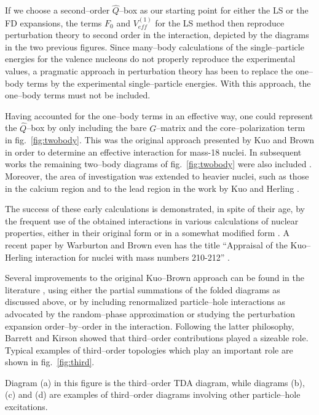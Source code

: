 If we choose a second--order $\hat{Q}$--box as our starting point for either the 
LS or the FD expansions, the terms 
$F_0$ and $V_{eff}^{(1)}$ for the LS method then reproduce perturbation theory to second order
in the interaction, depicted by the diagrams in the two previous figures. Since many--body
calculations of the single--particle energies for the valence nucleons do not
properly reproduce the experimental values, a pragmatic approach in perturbation theory has 
been to replace the one--body terms by the experimental single--particle energies. With this
approach, the one--body terms must not be included.

Having accounted for the one--body terms in an effective way, one could represent the
$\hat{Q}$--box by only including the bare $G$--matrix and the core--polarization term
in fig.\ \ref{fig:twobody}. This was the original approach presented by Kuo and Brown
\cite{kb66} in order to determine an effective interaction for mass-18 nuclei.
In subsequent works the remaining two--body diagrams of fig.\ \ref{fig:twobody} were
also included \cite{kuo68}. Moreover, the area of investigation was extended to heavier nuclei,
such as those in the calcium region \cite{kb68} and to the lead region in the work
by Kuo and Herling \cite{hk72}.

The success of these early calculations is demonstrated, in spite of their age,  by the frequent
use of the obtained interactions in various calculations of nuclear properties, either
in their original form or in a somewhat modified form \cite{brown88,ryd90}. A recent
paper by Warburton and Brown even has the title ``Appraisal of the Kuo--Herling interaction
for nuclei with mass numbers 210-212'' \cite{wb91}.

Several improvements to the original Kuo--Brown approach can be found in the literature
\cite{os87}, using either the partial summations of the folded diagrams as discussed
above, or by including renormalized particle--hole interactions as advocated by the
random--phase approximation or studying the perturbation expansion order--by--order
in the interaction. Following the latter philosophy, Barrett and Kirson \cite{bk70}
showed that third--order contributions played a sizeable role.
Typical examples of third--order topologies which play an important
role are shown in fig.\ \ref{fig:third}.


Diagram (a) in this figure is the third--order TDA diagram, while diagrams
(b), (c) and (d)
are examples of third--order diagrams involving other particle--hole
excitations.

